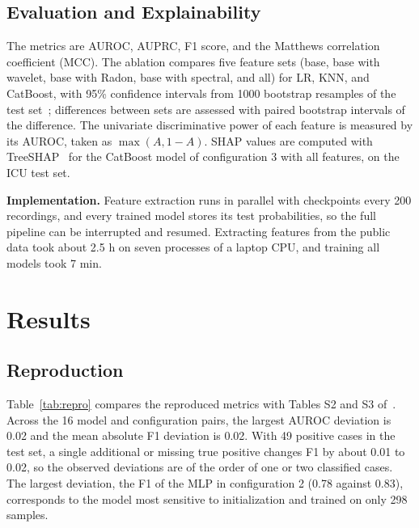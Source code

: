 \documentclass[conference,a4paper]{IEEEtran}
\begin{document}
\subsection{Evaluation and Explainability}

The metrics are AUROC, AUPRC, F1 score, and the Matthews correlation coefficient (MCC). The ablation compares five feature sets (base, base with wavelet, base with Radon, base with spectral, and all) for LR, KNN, and CatBoost, with 95\% confidence intervals from 1000 bootstrap resamples of the test set~\cite{efron1993}; differences between sets are assessed with paired bootstrap intervals of the difference. The univariate discriminative power of each feature is measured by its AUROC, taken as $\max(A, 1-A)$. SHAP values are computed with TreeSHAP~\cite{lundberg2020} for the CatBoost model of configuration 3 with all features, on the ICU test set.

\noindent\textbf{Implementation.} Feature extraction runs in parallel with checkpoints every 200 recordings, and every trained model stores its test probabilities, so the full pipeline can be interrupted and resumed. Extracting features from the public data took about 2.5 h on seven processes of a laptop CPU, and training all models took 7 min.

\section{Results}
\label{sec:results}

\subsection{Reproduction}

Table~\ref{tab:repro} compares the reproduced metrics with Tables S2 and S3 of~\cite{nassar2025}. Across the 16 model and configuration pairs, the largest AUROC deviation is 0.02 and the mean absolute F1 deviation is 0.02. With 49 positive cases in the test set, a single additional or missing true positive changes F1 by about 0.01 to 0.02, so the observed deviations are of the order of one or two classified cases. The largest deviation, the F1 of the MLP in configuration 2 (0.78 against 0.83), corresponds to the model most sensitive to initialization and trained on only 298 samples.
\end{document}
